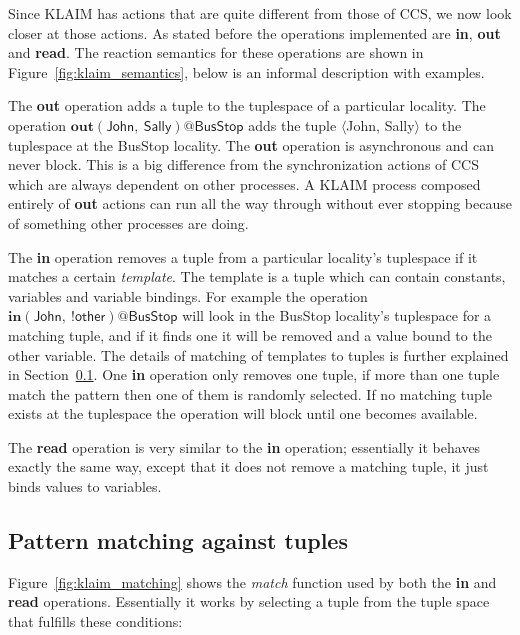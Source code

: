 	Since KLAIM has actions that are quite different from those of CCS, we now 
	look closer at those actions. As stated before the operations implemented 
	are \textbf{in}, \textbf{out} and \textbf{read}. The reaction semantics for 
	these operations are shown in Figure~\ref{fig:klaim_semantics}, below is an 
	informal description with examples.
	
	The \textbf{out} operation adds a tuple to the tuplespace of a particular 
	locality. The operation $\mathbf{out}\mathsf{(John,\ Sally)@BusStop}$ adds 
	the tuple $\langle$\textsf{John, Sally}$\rangle$ to the tuplespace at the 
	\textsf{BusStop} locality. The \textbf{out} operation is asynchronous and 
	can never block. This is a big difference from the synchronization actions 
	of CCS which are always dependent on other processes. A KLAIM process 
	composed entirely of \textbf{out} actions can run all the way through 
	without ever stopping because of something other processes are doing.
	
	The \textbf{in} operation removes a tuple from a particular locality's 
	tuplespace if it matches a certain \textit{template}. The template is a 
	tuple which can contain constants, variables and variable bindings. For 
	example the operation $\mathbf{in}\mathsf{(John,\ !other)@BusStop}$ will 
	look in the \textsf{BusStop} locality's tuplespace for a matching tuple, and 
	if it finds one it will be removed and a value bound to the \textsf{other} 
	variable.	The details of matching of templates to tuples is further 
	explained in Section~\ref{klaim_pattern_matching}. One \textbf{in} operation 
	only removes one tuple, if more than one tuple match the pattern then one of 
	them is randomly selected. If no matching tuple exists at the tuplespace the 
	operation will block until one becomes available.

	The \textbf{read} operation is very similar to the \textbf{in} operation; 
	essentially it behaves exactly the same way, except that it does not remove 
	a matching tuple, it just binds values to variables.

\subsection{Pattern matching against tuples}\label{klaim_pattern_matching}
	Figure~\ref{fig:klaim_matching} shows the \textit{match} function used by 
	both the \textbf{in} and \textbf{read} operations. Essentially it works by 
	selecting a tuple from the tuple space that fulfills these conditions:
	
